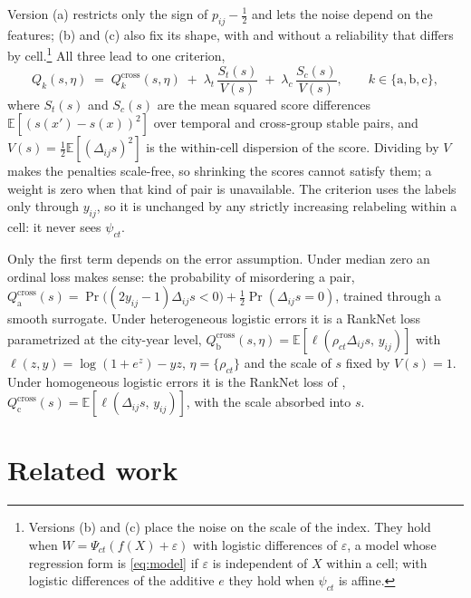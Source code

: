 \documentclass[11pt]{article}
\theoremstyle{tight}
\newcommand{\E}{\mathbb{E}}
\begin{document}
Version (a) restricts only the sign of $p_{ij}-\tfrac12$ and lets the noise depend on the
features; (b) and (c) also fix its shape, with and without a reliability that differs by
cell.\footnote{Versions (b) and (c) place the noise on the scale of the index. They hold when
$W=\Psi_{ct}(f(X)+\varepsilon)$ with logistic differences of $\varepsilon$, a model whose
regression form is \eqref{eq:model} if $\varepsilon$ is independent of $X$ within a cell; with
logistic differences of the additive $e$ they hold when $\psi_{ct}$ is affine.} All three lead to one criterion,
\begin{equation}\label{eq:crit}
  Q_k(s,\eta) \;=\; Q^{\mathrm{cross}}_k(s,\eta)
  \;+\;\lambda_t\,\frac{S_t(s)}{V(s)}
  \;+\;\lambda_c\,\frac{S_c(s)}{V(s)},
  \qquad k\in\{\mathrm{a},\mathrm{b},\mathrm{c}\},
\end{equation}
where $S_t(s)$ and $S_c(s)$ are the mean squared score differences $\E[(s(x')-s(x))^2]$ over
temporal and cross-group stable pairs, and $V(s)=\tfrac12\E[(\Delta_{ij}s)^2]$ is the within-cell
dispersion of the score. Dividing by $V$ makes the penalties scale-free, so shrinking the
scores cannot satisfy them; a weight is zero when that kind of pair is unavailable. The
criterion uses the labels only through $y_{ij}$, so it is unchanged by any strictly increasing
relabeling within a cell: it never sees $\psi_{ct}$.

Only the first term depends on the error assumption. Under median zero an ordinal loss makes
sense: the probability of misordering a pair,
$Q^{\mathrm{cross}}_{\mathrm a}(s)=\Pr\bigl((2y_{ij}-1)\Delta_{ij}s<0\bigr)+\tfrac12\Pr(\Delta_{ij}s=0)$,
trained through a smooth surrogate. Under heterogeneous logistic errors it is a RankNet loss
parametrized at the city-year level,
$Q^{\mathrm{cross}}_{\mathrm b}(s,\eta)=\E[\ell(\rho_{ct}\Delta_{ij}s,\,y_{ij})]$ with
$\ell(z,y)=\log(1+e^{z})-yz$, $\eta=\{\rho_{ct}\}$ and the scale of $s$ fixed by $V(s)=1$. Under
homogeneous logistic errors it is the RankNet loss of \citet{burges2005},
$Q^{\mathrm{cross}}_{\mathrm c}(s)=\E[\ell(\Delta_{ij}s,\,y_{ij})]$, with the scale absorbed
into $s$.

\section{Related work}
\end{document}
